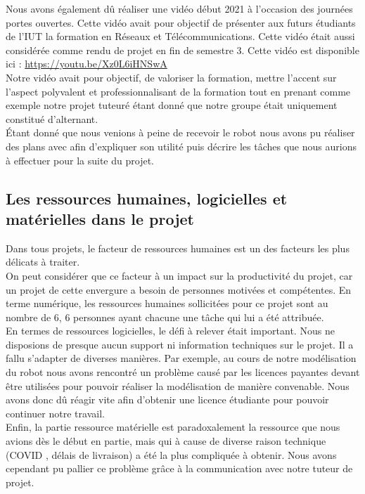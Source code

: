 \documentclass{PackagerQualityN}
\begin{document}
Nous avons également dû réaliser une vidéo début 2021 à l'occasion des journées portes ouvertes. Cette vidéo avait pour objectif de présenter aux futurs étudiants de l'IUT la formation en Réseaux et Télécommunications. Cette vidéo était aussi considérée comme rendu de projet en fin de semestre 3. Cette vidéo est disponible ici : \url{https://youtu.be/Xz0L6iHNSwA}\\


Notre vidéo avait pour objectif, de valoriser la formation, mettre l'accent sur l'aspect polyvalent et professionnalisant de la formation tout en prenant comme exemple notre projet tuteuré étant donné que notre groupe était uniquement constitué d'alternant.\\

Étant donné que nous venions à peine de recevoir le robot nous avons pu réaliser des plans avec afin d’expliquer son utilité puis décrire les tâches que nous aurions à effectuer pour la suite du projet.\\


\subsection*{Les ressources humaines, logicielles et matérielles dans le projet}
Dans tous projets, le facteur de ressources humaines est un des facteurs les plus délicats à traiter.\\

On peut considérer que ce facteur à un impact sur la productivité du projet, car un projet de cette envergure a besoin de personnes motivées et compétentes. En terme numérique, les ressources humaines sollicitées pour ce projet sont au nombre de 6, 6 personnes ayant chacune une tâche qui lui a été attribuée. \\

En termes de ressources logicielles, le défi à relever était important. Nous ne disposions de presque aucun support ni information techniques sur le projet. Il a fallu s'adapter de diverses manières. Par exemple, au cours de notre modélisation du robot nous avons rencontré un problème causé par les licences payantes devant être utilisées pour pouvoir réaliser la modélisation de manière convenable. Nous avons donc dû réagir vite afin d'obtenir une licence étudiante pour pouvoir continuer notre travail.\\

Enfin, la partie ressource matérielle est paradoxalement la ressource que nous avions dès le début en partie, mais qui à cause de diverse raison technique (COVID , délais de livraison) a été la plus compliquée à obtenir. Nous avons cependant pu pallier  ce problème grâce à la communication avec notre tuteur de projet.
\end{document}
